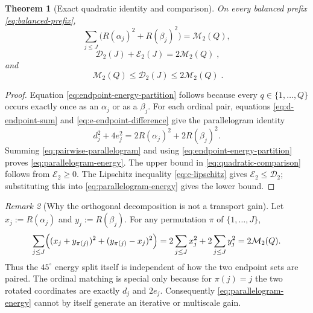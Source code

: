\documentclass[11pt]{amsart}
\numberwithin{equation}{section}
\theoremstyle{plain}
\newtheorem{theorem}{Theorem}[section]
\theoremstyle{definition}
\theoremstyle{remark}
\newtheorem{remark}[theorem]{Remark}
\begin{document}
\begin{theorem}[Exact quadratic identity and comparison]
\label{thm:quadratic-pairing}
On every balanced prefix \eqref{eq:balanced-prefix},
\begin{equation}
\label{eq:endpoint-energy-partition}
\sum_{j\le J}\bigl(R(\alpha_j)^2+R(\beta_j)^2\bigr)
=\mathcal M_2(Q),
\end{equation}
\begin{equation}
\label{eq:parallelogram-energy}
\boxed{\;\mathcal D_2(J)+\mathcal E_2(J)=2\mathcal M_2(Q)\;},
\end{equation}
and
\begin{equation}
\label{eq:quadratic-comparison}
\boxed{\;\mathcal M_2(Q)\le\mathcal D_2(J)\le2\mathcal M_2(Q)\;}.
\end{equation}
\end{theorem}

\begin{proof}
Equation \eqref{eq:endpoint-energy-partition} follows because every
$q\in\{1,\ldots,Q\}$ occurs exactly once as an $\alpha_j$ or as a $\beta_j$.
For each ordinal pair, equations \eqref{eq:d-endpoint-sum} and
\eqref{eq:e-endpoint-difference} give the parallelogram identity
\begin{equation}
\label{eq:pairwise-parallelogram}
d_j^2+4e_j^2
=2R(\alpha_j)^2+2R(\beta_j)^2.
\end{equation}
Summing \eqref{eq:pairwise-parallelogram} and using
\eqref{eq:endpoint-energy-partition} proves
\eqref{eq:parallelogram-energy}.  The upper bound in
\eqref{eq:quadratic-comparison} follows from $\mathcal E_2\ge0$.  The
Lipschitz inequality \eqref{eq:e-lipschitz} gives
$\mathcal E_2\le\mathcal D_2$; substituting this into
\eqref{eq:parallelogram-energy} gives the lower bound.
\end{proof}

\begin{remark}[Why the orthogonal decomposition is not a transport gain]
\label{rem:pairing-insensitive}
Let $x_j:=R(\alpha_j)$ and $y_j:=R(\beta_j)$.  For any permutation $\pi$ of
$\{1,\ldots,J\}$,
\begin{equation}
\label{eq:permutation-parallelogram}
\sum_{j\le J}\Bigl((x_j+y_{\pi(j)})^2+(y_{\pi(j)}-x_j)^2\Bigr)
=2\sum_{j\le J}x_j^2+2\sum_{j\le J}y_j^2
=2\mathcal M_2(Q).
\end{equation}
Thus the $45^\circ$ energy split itself is independent of how the two endpoint
sets are paired.  The ordinal matching is special only because for $\pi(j)=j$
the two rotated coordinates are exactly $d_j$ and $2e_j$.  Consequently
\eqref{eq:parallelogram-energy} cannot by itself generate an iterative or
multiscale gain.
\end{remark}
\end{document}
